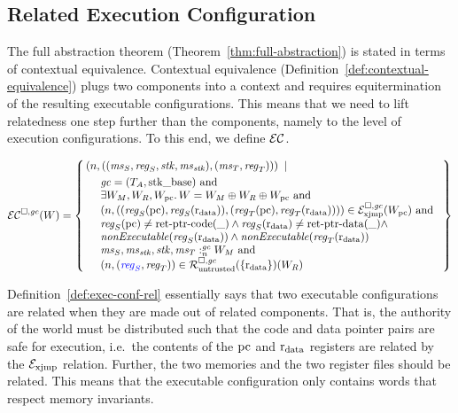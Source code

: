 \begin{jversion}
\subsection{Related Execution Configuration}
The full abstraction theorem (Theorem~\ref{thm:full-abstraction}) is stated in terms of contextual equivalence.
Contextual equivalence (Definition~\ref{def:contextual-equivalence}) plugs two components into a context and requires equitermination of the resulting executable configurations.
This means that we need to lift relatedness one step further than the components, namely to the level of execution configurations.
To this end, we define $\mathcal{EC}$.
\begin{definition}
\label{def:exec-conf-rel}
  \[
  \lrec(W) = \left\{
    \begin{multlined}
\npair{\left(
        (\ms_S,\reg_S,\stk,\ms_\stk),
        (\ms_T,\reg_T)\right)} \; \mid \; \\
    \begin{array}{l}
      \gc = (\ta,\stkb) \tand\\
      \exists W_M,W_R,W_\pcreg \ldotp W = W_M \oplus W_R \oplus W_\pcreg \tand\\
      \npair{( (\reg_S(\pcreg),\reg_S(\rdata)), (\reg_T(\pcreg),\reg_T(\rdata)) )} \in \lrexj(W_\pcreg) \tand \\
      \reg_S(\pcreg) \neq \retptrc(\_) \wedge 
      \reg_S(\rdata) \neq \retptrd(\_) \wedge \\
      \nonExec{\reg_S(\rdata)} \wedge
      \nonExec{\reg_T(\rdata)}\\
      \memSat{\ms_S,\ms_\stk,\stk,\ms_T}{W_M} \tand\\
      \npair{\stpair{\reg}{\reg}} \in \lrr(\{\rdata\})(W_R)
    \end{array}
  \end{multlined}
\right\}
\]
\end{definition}
Definition~\ref{def:exec-conf-rel} essentially says that two executable configurations are related when they are made out of related components.
That is, the authority of the world must be distributed such that the code and data pointer pairs are safe for execution, i.e.\ the contents of the $\mathrm{pc}$ and $\mathrm{r}_\mathrm{data}$ registers are related by the $\mathcal{E}_\mathrm{xjmp}$ relation.
Further, the two memories and the two register files should be related.
This means that the executable configuration only contains words that respect memory invariants.

\end{jversion}


